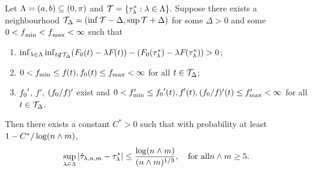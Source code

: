 \begin{proposition}\label{prop:convergence.rate.uniform}
   Let $\Lambda = (a, b) \subseteq (0,{\pi})$ and $\mathcal{T} =
   \{{\tau^*_\lambda}: \lambda \in \Lambda\}$. Suppose there exists
   a neighbourhood $\mathcal{T}_\Delta = (\inf {\mathcal{T}} - \Delta, \sup
   {\mathcal{T}} + \Delta)$ for some $\Delta > 0$ and some $0 <
   {f_{}}_{\min} < {f_{}}_{\max} < \infty$
   such that
   \begin{enumerate}
        \item \label{prop:assu:Bayes.risk.uniform}  $\inf_{\lambda \in
            \Lambda}\inf_{{t} \notin
            \mathcal{T}_\Delta}({F_{0}}({t}) - \lambda
          {F_{}}({t})) -
          ({F_{0}}({\tau^*_\lambda}) - \lambda
          {F_{}}({\tau^*_\lambda})) > 0$;
        \item \label{prop:assu:density.upper.bound.uniform}
          $0 < {f_{\min}} \leq {f_{}}(t),{f_{0}}(t) \leq  {f_{\max}} < \infty$ for
          all ${t} \in \mathcal{T}_{\Delta}$;
        \item \label{prop:assu:MLR.uniform}
           ${f_{0}}'$, $f'$, $({f_{0}}/{f_{}})'$ exist and $0 < f_{\min}'
     \le {f_{0}}'({t}), {f_{}}'({t}), ({f_{0}}/{f_{}})'({t}) \le f_{\max}' < \infty$  for
          all ${t} \in \mathcal{T}_{\Delta}$.
    \end{enumerate}
    Then there exists a constant $C^* > 0$ such that with probability at least $1 - C^*/\log({n} \wedge m)$,
    \begin{align}\label{eq:prop:convergence.rate}
        \sup_{\lambda \in \Lambda}\left|{\hat{\tau}_{\lambda, {n}, m}} - {\tau^*_\lambda}\right|
        \le \frac{\log({n} \wedge m)}{({n} \wedge m)^{1/3}}, \quad \text{for all} {n} \wedge m \ge 5.
    \end{align}
\end{proposition}


